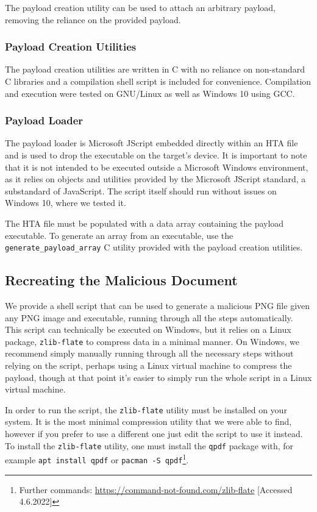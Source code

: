 The payload creation utility can be used to attach an arbitrary payload, removing the reliance on the provided 
payload.

\subsubsection{Payload Creation Utilities}
The payload creation utilities are written in C with no reliance on non-standard C libraries and a compilation
shell script is included for convenience. Compilation and execution were tested on GNU/Linux as well as Windows 10
using \acrshort{GCC}.

\subsubsection{Payload Loader}
The payload loader is Microsoft JScript embedded directly within an \acrfull{HTA} file and is used to drop the
executable on the target's device. It is important to note that it is not intended to be executed outside a 
Microsoft Windows environment, as it relies on objects and utilities provided by the Microsoft JScript standard,
a substandard of JavaScript. The script itself should run without issues on Windows 10, where we tested it.

The \acrshort{HTA} file must be populated with a data array containing the payload executable. To generate an array
from an executable, use the \verb+generate_payload_array+ C utility provided with the payload creation utilities.

\subsection{Recreating the Malicious Document}
We provide a shell script that can be used to generate a malicious \acrshort{PNG} file given any \acrshort{PNG} 
image and executable, running through all the steps automatically. This script can technically be executed on Windows,
but it relies on a Linux package, \verb+zlib-flate+ to compress data in a minimal manner. On Windows, we recommend
simply manually running through all the necessary steps without relying on the script, perhaps using a Linux virtual 
machine to  compress the payload, though at that point it's easier to simply run the whole script in a 
Linux virtual machine.

In order to run the script, the \verb+zlib-flate+ utility must be installed on your system. It is the most minimal
compression utility that we were able to find, however if you prefer to use a different one just edit the script to use
it instead. To install the \verb+zlib-flate+ utility, one must install the \verb+qpdf+ package with, for example
\verb+apt install qpdf+ or \verb+pacman -S qpdf+\footnote{Further commands:
\url{https://command-not-found.com/zlib-flate} [Accessed 4.6.2022]}. 
\clearpage %


